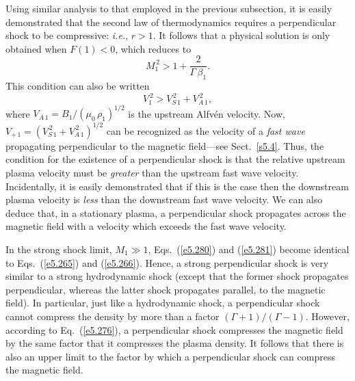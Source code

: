 Using similar analysis to that employed in the previous subsection, it
is easily  demonstrated that the second law of thermodynamics requires a
perpendicular shock to be compressive: {\em i.e.}, $r>1$. It follows that a physical solution
is only obtained when $F(1)<0$, which reduces to
\begin{equation}
M_1^{\,2} > 1 + \frac{2}{\Gamma\,\beta_1}.
\end{equation}
This condition can also be written
\begin{equation}
V_1^{\,2} > V_{S\,1}^{\,2} + V_{A\,1}^{\,2},
\end{equation}
where $V_{A\,1}=B_1/(\mu_0\,\rho_1)^{1/2}$ is the upstream
Alfv\'{e}n velocity. Now,  $V_{+\,1} = (V_{S\,1}^{\,2} + V_{A\,1}^{\,2})^{1/2}$ can be recognized as the velocity of a {\em fast wave}\/ propagating
perpendicular to the magnetic field---see Sect.~\ref{s5.4}. Thus, the
condition for the existence of a perpendicular shock is that the relative
upstream plasma velocity must be {\em greater}\/  than  the upstream fast wave velocity. Incidentally, it is easily
demonstrated that if this is the case then  the downstream plasma velocity is {\em less}\/ than the downstream
fast wave velocity.    We can also deduce  that, in a stationary plasma, a
perpendicular shock propagates across the magnetic field with
a velocity which exceeds the fast wave velocity.

In the strong shock limit, $M_1\gg 1$, Eqs.~(\ref{e5.280}) and (\ref{e5.281}) become identical to Eqs.~(\ref{e5.265}) and (\ref{e5.266}).
Hence, a strong  perpendicular shock is very similar to a strong hydrodynamic shock (except that the former shock
propagates perpendicular, whereas the latter
shock propagates parallel,  to the magnetic field). In particular, just like a hydrodynamic shock, a
perpendicular shock cannot
compress the density by more than a factor $(\Gamma+1)/(\Gamma-1)$. However, according to
Eq.~(\ref{e5.276}), a perpendicular shock compresses the magnetic field by the same
factor that it compresses the plasma density. It follows that there is
also an upper limit to the factor by which a perpendicular shock can compress the magnetic field.

